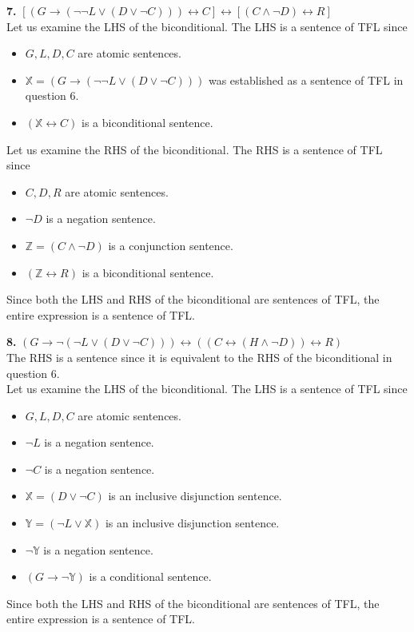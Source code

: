 \documentclass[a4paper,11pt]{article}
\theoremstyle{mytheor}
\let\biconditional\leftrightarrow
\begin{document}
\noindent\textbf{7.} $[(G \to (\neg \neg L \lor (D \lor \neg C))) \biconditional C] \biconditional [(C \land \neg D) \biconditional R]$ \\
Let us examine the LHS of the biconditional. The LHS is a sentence of TFL since
\begin{itemize}
    \item $G, L, D, C$ are atomic sentences.
    \item $\mathbb{X} = (G \to (\neg \neg L \lor (D \lor \neg C)))$ was established as a sentence of TFL in question 6.
    \item $(\mathbb{X} \biconditional C)$ is a biconditional sentence.
\end{itemize}
Let us examine the RHS of the biconditional. The RHS is a sentence of TFL since
\begin{itemize}
    \item $C, D, R$ are atomic sentences.
    \item $\neg D$ is a negation sentence.
    \item $\mathbb{Z} = (C \land \neg D)$ is a conjunction sentence.
    \item $(\mathbb{Z} \biconditional R)$ is a biconditional sentence.
\end{itemize}
\begin{framed}
\noindent Since both the LHS and RHS of the biconditional are sentences of TFL, the entire expression is a sentence of TFL.
\end{framed}

\noindent\textbf{8.} $(G \to \neg (\neg L \lor (D \lor \neg C))) \biconditional ((C \biconditional (H \land \neg D)) \biconditional R)$ \\
The RHS is a sentence since it is equivalent to the RHS of the biconditional in question 6. \\

\noindent Let us examine the LHS of the biconditional. The LHS is a sentence of TFL since
\begin{itemize}
    \item $G, L, D, C$ are atomic sentences.
    \item $\neg L$ is a negation sentence.
    \item $\neg C$ is a negation sentence.
    \item $\mathbb{X} = (D \lor \neg C)$ is an inclusive disjunction sentence.
    \item $\mathbb{Y} = (\neg L \lor \mathbb{X})$ is an inclusive disjunction sentence.
    \item $\neg \mathbb{Y}$ is a negation sentence.
    \item $(G \to \neg \mathbb{Y})$ is a conditional sentence.
\end{itemize}
\begin{framed}
\noindent Since both the LHS and RHS of the biconditional are sentences of TFL, the entire expression is a sentence of TFL.
\end{framed}
\end{document}
